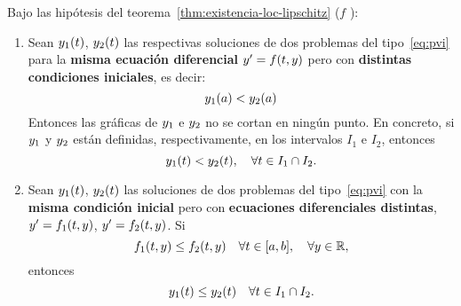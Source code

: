 \begin{proposition}
\label{pro:propiedades-pvi}
  Bajo las hipótesis del teorema~\ref{thm:existencia-loc-lipschitz}
  ($f$ \locLipschitz):
  \begin{enumerate}
  \item Sean $\sol_1(\tt)$, $\sol_2(\tt)$ las respectivas soluciones
    de dos problemas del tipo~\eqref{eq:pvi} para la \textbf{misma
      ecuación diferencial} $y'=f(\tt,y)$ pero con \textbf{distintas
      condiciones iniciales}, es decir:
    $$\sol_1(\ta)<\sol_2(\ta)$$
    Entonces las gráficas de $\sol_1$ e $\sol_2$ no se cortan en
    ningún punto. En concreto, si $\sol_1$ y $\sol_2$ están
    definidas, respectivamente, en los intervalos $I_1$ e $I_2$,
    entonces
    \begin{equation*}
      \sol_1(\tt) < \sol_2(\tt), \quad \forall \tt \in I_1
      \cap I_2.
    \end{equation*}

  \item Sean $\sol_1(\tt)$, $\sol_2(\tt)$ las soluciones de dos
    problemas del tipo~\eqref{eq:pvi} con la \textbf{misma condición
      inicial} pero con \textbf{ecuaciones diferenciales distintas},
    $y'=f_1(\tt,y)$, $y'=f_2(\tt,y)$. Si
    $$
    f_1(\tt,y) \le f_2(\tt,y) \quad \forall \tt\in[\ta,\tb], \quad
    \forall y\in\Rset,
    $$
    entonces
    $$
    \sol_1(\tt)\le \sol_2(\tt) \quad \forall \tt \in
    I_1 \cap I_2.
    $$
  \end{enumerate}
\end{proposition}

